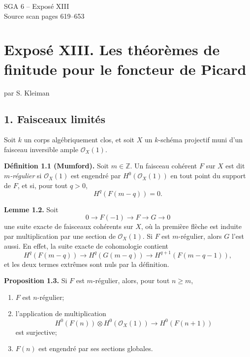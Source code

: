 \documentclass[11pt]{article}
\begin{document}
\providecommand{\Ass}{\operatorname{Ass}}
\providecommand{\Hom}{\operatorname{Hom}}
\providecommand{\Ext}{\operatorname{Ext}}
\providecommand{\Proj}{\operatorname{Proj}}
\providecommand{\NS}{\operatorname{NS}}
\providecommand{\Tors}{\operatorname{Tors}}
\providecommand{\Picnum}{\operatorname{Pic}^{\mathrm{num}}}
\providecommand{\Piczero}{\operatorname{Pic}^{0}}
\providecommand{\Pictau}{\operatorname{Pic}^{\tau}}
\providecommand{\length}{\operatorname{length}}
\providecommand{\etale}{\text{\'etale}}

\begin{center}
{\Large SGA 6 -- Expos\'e XIII}\\[0.4em]
{\large Source scan pages 619--653}
\end{center}

\section*{Expos\'e XIII. Les th\'eor\`emes de finitude pour le foncteur de Picard}
\begin{center}
par S. Kleiman
\end{center}

\subsection*{1. Faisceaux limit\'es}
Soit $k$ un corps alg\'ebriquement clos, et soit $X$ un $k$-sch\'ema projectif muni d'un faisceau inversible ample $\mathcal O_X(1)$.

\textbf{D\'efinition 1.1 (Mumford).} Soit $m\in\mathbb Z$. Un faisceau coh\'erent $F$ sur $X$ est dit \emph{$m$-r\'egulier} si $\mathcal O_X(1)$ est engendr\'e par $H^0(\mathcal O_X(1))$ en tout point du support de $F$, et si, pour tout $q>0$,
\[
 H^q(F(m-q))=0.
\]

\textbf{Lemme 1.2.} Soit
\[
0\longrightarrow F(-1)\longrightarrow F\longrightarrow G\longrightarrow 0
\]
une suite exacte de faisceaux coh\'erents sur $X$, o\`u la premi\`ere fl\`eche est induite par multiplication par une section de $\mathcal O_X(1)$. Si $F$ est $m$-r\'egulier, alors $G$ l'est aussi. En effet, la suite exacte de cohomologie contient
\[
H^q(F(m-q))\longrightarrow H^q(G(m-q))\longrightarrow H^{q+1}(F(m-q-1)),
\]
et les deux termes extr\^emes sont nuls par la d\'efinition.

\textbf{Proposition 1.3.} Si $F$ est $m$-r\'egulier, alors, pour tout $n\ge m$,
\begin{enumerate}[label=\roman*)]
\item $F$ est $n$-r\'egulier;
\item l'application de multiplication
\[
 H^0(F(n))\otimes H^0(\mathcal O_X(1))\longrightarrow H^0(F(n+1))
\]
est surjective;
\item $F(n)$ est engendr\'e par ses sections globales.
\end{enumerate}
\end{document}

